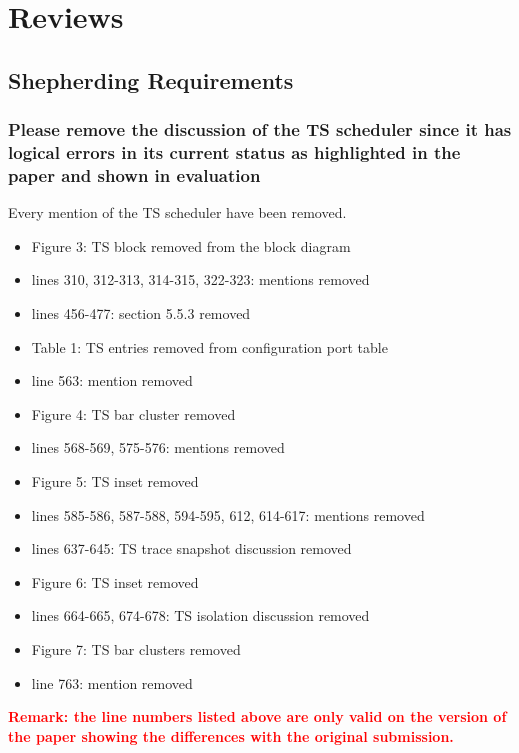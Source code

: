 \newpage
\section{Reviews}

    \subsection{Shepherding Requirements}

        \subsubsection{Please remove the discussion of the TS
        scheduler since it has logical errors in its current status as
        highlighted in the paper and shown in evaluation}

         \label{subsubsec:ts_removal}
            Every mention of the TS scheduler have been removed.
            \begin{itemize}
                \item Figure 3: TS block removed from the block diagram
                \item lines 310, 312-313, 314-315, 322-323: mentions removed
                \item lines 456-477: section 5.5.3 removed
                \item Table 1: TS entries removed from configuration port table
                \item line 563: mention removed
                \item Figure 4: TS bar cluster removed
                \item lines 568-569, 575-576: mentions removed
                \item Figure 5: TS inset removed
                \item lines 585-586, 587-588, 594-595, 612, 614-617: mentions removed
                \item lines 637-645: TS trace snapshot discussion removed
                \item Figure 6: TS inset removed
                \item lines 664-665, 674-678: TS isolation discussion removed
                \item Figure 7: TS bar clusters removed
                \item line 763: mention removed
            \end{itemize}
            \textcolor{red}{\textbf{Remark: the line numbers listed above are only valid on the version of the paper showing the differences with the original submission.}}

